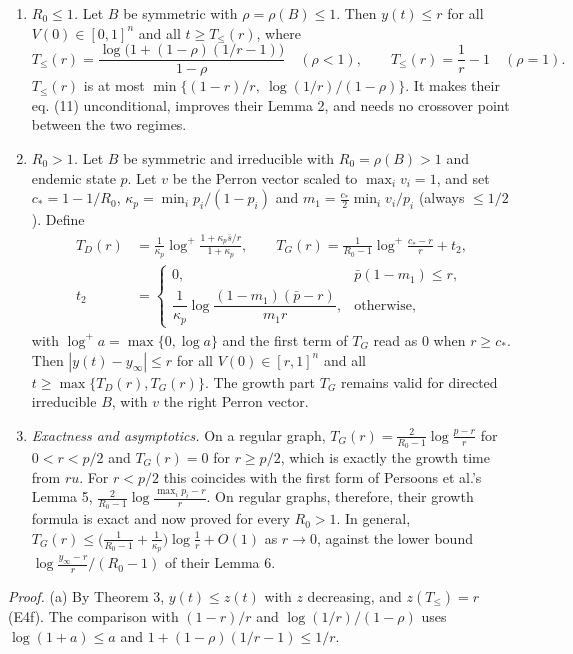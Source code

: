 \documentclass[
  11pt,
  a4paper,
]{article}
\begin{document}
\begin{enumerate}
\def\labelenumi{(\alph{enumi})}
\item
  \emph{\(R_0\le1\).} Let \(B\) be symmetric with \(\rho=\rho(B)\le1\).
  Then \(y(t)\le r\) for all \(V(0)\in[0,1]^n\) and all
  \(t\ge T_\le(r)\), where
  \[T_\le(r)=\frac{\log\big(1+(1-\rho)(1/r-1)\big)}{1-\rho}\quad(\rho<1),\qquad T_\le(r)=\frac1r-1\quad(\rho=1). \tag{9.1}\]
  \(T_\le(r)\) is at most \(\min\{(1-r)/r,\ \log(1/r)/(1-\rho)\}\). It
  makes their eq. (11) unconditional, improves their Lemma 2, and needs
  no crossover point between the two regimes.
\item
  \emph{\(R_0>1\).} Let \(B\) be symmetric and irreducible with
  \(R_0=\rho(B)>1\) and endemic state \(p\). Let \(v\) be the Perron
  vector scaled to \(\max_iv_i=1\), and set \(c_*=1-1/R_0\),
  \(\kappa_p=\min_ip_i/(1-p_i)\) and \(m_1=\tfrac{c_*}2\min_iv_i/p_i\)
  (always \(\le1/2\)). Define \[
  \begin{aligned}
  T_D(r)&=\frac1{\kappa_p}\log^+\frac{1+\kappa_p\bar s/r}{1+\kappa_p},\qquad
  T_G(r)=\frac{1}{R_0-1}\log^+\frac{c_*-r}{r}+t_2,\\
  t_2&=\begin{cases}0,&\bar p(1-m_1)\le r,\\[0.5ex]\dfrac1{\kappa_p}\log\dfrac{(1-m_1)(\bar p-r)}{m_1r},&\text{otherwise,}\end{cases}
  \end{aligned} \tag{9.2}
  \] with \(\log^+a=\max\{0,\log a\}\) and the first term of \(T_G\)
  read as \(0\) when \(r\ge c_*\). Then \(|y(t)-y_\infty|\le r\) for all
  \(V(0)\in[r,1]^n\) and all \(t\ge\max\{T_D(r),T_G(r)\}\). The growth
  part \(T_G\) remains valid for directed irreducible \(B\), with \(v\)
  the right Perron vector.
\item
  \emph{Exactness and asymptotics.} On a regular graph,
  \(T_G(r)=\frac{2}{R_0-1}\log\frac{p-r}{r}\) for \(0<r<p/2\) and
  \(T_G(r)=0\) for \(r\ge p/2\), which is exactly the growth time from
  \(ru\). For \(r<p/2\) this coincides with the first form of Persoons
  et al.'s Lemma 5, \(\frac{2}{R_0-1}\log\frac{\max_ip_i-r}{r}\). On
  regular graphs, therefore, their growth formula is exact and now
  proved for every \(R_0>1\). In general,
  \(T_G(r)\le\big(\frac1{R_0-1}+\frac1{\kappa_p}\big)\log\frac1r+O(1)\)
  as \(r\to0\), against the lower bound
  \(\log\frac{y_\infty-r}{r}/(R_0-1)\) of their Lemma 6.
\end{enumerate}

\emph{Proof.} (a) By Theorem 3, \(y(t)\le z(t)\) with \(z\) decreasing,
and \(z(T_\le)=r\) (E4f). The comparison with \((1-r)/r\) and
\(\log(1/r)/(1-\rho)\) uses \(\log(1+a)\le a\) and
\(1+(1-\rho)(1/r-1)\le1/r\).
\end{document}
